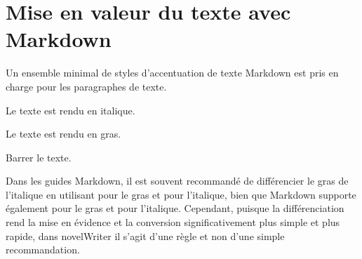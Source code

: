 \documentclass[a4paper,11pt,french]{sphinxmanual}
\begin{document}
\section{Mise en valeur du texte avec Markdown}
\label{\detokenize{usage_format:text-emphasis-with-markdown}}\label{\detokenize{usage_format:a-fmt-emph}}
\sphinxAtStartPar
Un ensemble minimal de styles d’accentuation de texte Markdown est pris en charge pour les paragraphes de texte.
\begin{description}
\sphinxAtStartPar
Le texte est rendu en italique.

\sphinxAtStartPar
Le texte est rendu en gras.

\sphinxAtStartPar
Barrer le texte.

\end{description}

\sphinxAtStartPar
Dans les guides Markdown, il est souvent recommandé de différencier le gras de l’italique en utilisant \sphinxcode{\sphinxupquote{**}} pour le gras et \sphinxcode{\sphinxupquote{\_}} pour l’italique, bien que Markdown supporte également \sphinxcode{\sphinxupquote{\_\_}} pour le gras et \sphinxcode{\sphinxupquote{*}} pour l’italique. Cependant, puisque la différenciation rend la mise en évidence et la conversion significativement plus simple et plus rapide, dans novelWriter il s’agit d’une règle et non d’une simple recommandation.
\end{document}
